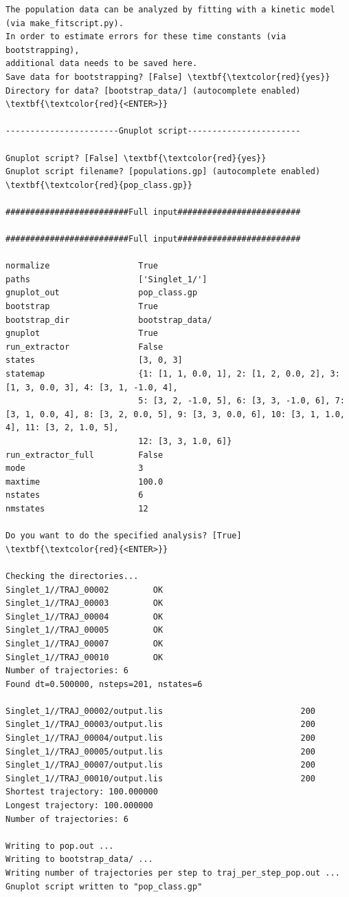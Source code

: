 \documentclass[a4paper,11pt,DIV=15,openany]{scrbook}
\begin{document}
\begin{oframed}
\begin{Verbatim}[commandchars=\\\{\}]
The population data can be analyzed by fitting with a kinetic model (via make_fitscript.py). 
In order to estimate errors for these time constants (via bootstrapping), 
additional data needs to be saved here.
Save data for bootstrapping? [False] \textbf{\textcolor{red}{yes}}
Directory for data? [bootstrap_data/] (autocomplete enabled) \textbf{\textcolor{red}{<ENTER>}}

-----------------------Gnuplot script-----------------------

Gnuplot script? [False] \textbf{\textcolor{red}{yes}}
Gnuplot script filename? [populations.gp] (autocomplete enabled) \textbf{\textcolor{red}{pop_class.gp}}

#########################Full input#########################

#########################Full input#########################

normalize                  True
paths                      ['Singlet_1/']
gnuplot_out                pop_class.gp
bootstrap                  True
bootstrap_dir              bootstrap_data/
gnuplot                    True
run_extractor              False
states                     [3, 0, 3]
statemap                   {1: [1, 1, 0.0, 1], 2: [1, 2, 0.0, 2], 3: [1, 3, 0.0, 3], 4: [3, 1, -1.0, 4],
                           5: [3, 2, -1.0, 5], 6: [3, 3, -1.0, 6], 7: [3, 1, 0.0, 4], 8: [3, 2, 0.0, 5], 9: [3, 3, 0.0, 6], 10: [3, 1, 1.0, 4], 11: [3, 2, 1.0, 5],
                           12: [3, 3, 1.0, 6]}
run_extractor_full         False
mode                       3
maxtime                    100.0
nstates                    6
nmstates                   12

Do you want to do the specified analysis? [True] \textbf{\textcolor{red}{<ENTER>}}

Checking the directories...
Singlet_1//TRAJ_00002         OK
Singlet_1//TRAJ_00003         OK
Singlet_1//TRAJ_00004         OK
Singlet_1//TRAJ_00005         OK
Singlet_1//TRAJ_00007         OK
Singlet_1//TRAJ_00010         OK
Number of trajectories: 6
Found dt=0.500000, nsteps=201, nstates=6

Singlet_1//TRAJ_00002/output.lis                            200
Singlet_1//TRAJ_00003/output.lis                            200
Singlet_1//TRAJ_00004/output.lis                            200
Singlet_1//TRAJ_00005/output.lis                            200
Singlet_1//TRAJ_00007/output.lis                            200
Singlet_1//TRAJ_00010/output.lis                            200
Shortest trajectory: 100.000000
Longest trajectory: 100.000000
Number of trajectories: 6

Writing to pop.out ...
Writing to bootstrap_data/ ...
Writing number of trajectories per step to traj_per_step_pop.out ...
Gnuplot script written to "pop_class.gp"
\end{Verbatim}
\end{oframed}
\end{document}
